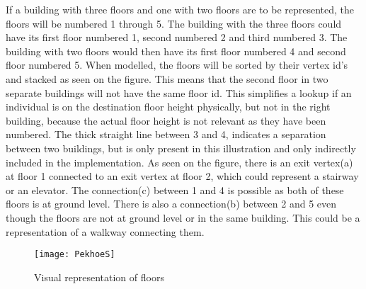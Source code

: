 If a building with three floors and one with two floors are to be represented, the floors will be numbered 1 through 5. The building with the three floors could have its first floor numbered 1, second numbered 2 and third numbered 3. The building with two floors would then have its first floor numbered 4 and second floor numbered 5. When modelled, the floors will be sorted by their vertex id's and stacked as seen on the figure. This means that the second floor in two separate buildings will not have the same floor id. This simplifies a lookup if an individual is on the destination floor height physically, but not in the right building, because the actual floor height is not relevant as they have been numbered. The thick straight line between 3 and 4, indicates a separation between two buildings, but is only present in this illustration and only indirectly included in the implementation. As seen on the figure, there is an exit vertex(a) at floor 1 connected to an exit vertex at floor 2, which could represent a stairway or an elevator. The connection(c) between 1 and 4 is possible as both of these floors is at ground level. There is also a connection(b) between 2 and 5 even though the floors are not at ground level or in the same building. This could be a representation of a walkway connecting them.
\begin{figure}[ht!]
    \centering
    \texttt{[image: PekhoeS]}
    \caption{Visual representation of floors}
    \label{fig:PekhoeS}
  \end{figure}
